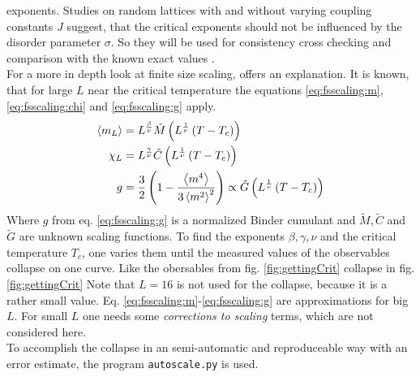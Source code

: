     exponents.
    Studies on random lattices with\cite{Lima2000} and without\cite{Janke1994}
    varying coupling constants \(J\) suggest, that the
    critical exponents should not be influenced by the disorder parameter
    \(\sigma\). So they will be used for consistency cross checking and
    comparison with the known exact values \cite[S. 59]{Pelissetto2002}.\\
    For a more in depth look at finite size scaling, \cite{Norrenbrock2011}
    offers an explanation.
    It is known, that for large \(L\) near the critical temperature the
    equations \eqref{eq:fsscaling:m}, \eqref{eq:fsscaling:chi} and
    \eqref{eq:fsscaling:g} apply.
    \begin{align}
        \label{eq:fsscaling:m}
        \left< m_L \right> &= L^\frac{\beta}{\nu} \tilde{M}\left(L^\frac{1}{\nu}\left(T-T_c\right)\right)\\
        \label{eq:fsscaling:chi}
        \chi_L    &= L^\frac{\gamma}{\nu} \tilde{C}\left(L^\frac{1}{\nu}\left(T-T_c\right)\right)\\
        \label{eq:fsscaling:g}
        g          &= \frac{3}{2}\left(1-\frac{\left< m^4 \right>}{3\left< m^2 \right>^2}\right) \propto \tilde{G}\left(L^\frac{1}{\nu}\left(T-T_c\right)\right)
    \end{align}
    Where \(g\) from eq. \eqref{eq:fsscaling:g} is a normalized
    Binder cumulant \cite{Binder1981} and \(\tilde{M}, \tilde{C}\) and \(\tilde{G}\)
    are unknown scaling functions. To find the exponents
    \(\beta, \gamma, \nu\) and the critical temperature \(T_c\), one
    varies them until the measured values of the observables collapse on
    one curve. Like the obersables from fig. \ref{fig:gettingCrit}
    collapse in fig. \ref{fig:gettingCrit}%
    Note that \(L=16\) is not used for the collapse, because it is a
    rather small value. Eq. \eqref{eq:fsscaling:m}-\eqref{eq:fsscaling:g}
    are approximations for big \(L\). For small \(L\) one needs some
    \emph{corrections to scaling} terms, which are not considered here.\\
    To accomplish the collapse in an semi-automatic and reproduceable
    way with an error estimate, the program
    \texttt{autoscale.py} \cite{autoscale2009} is used.
